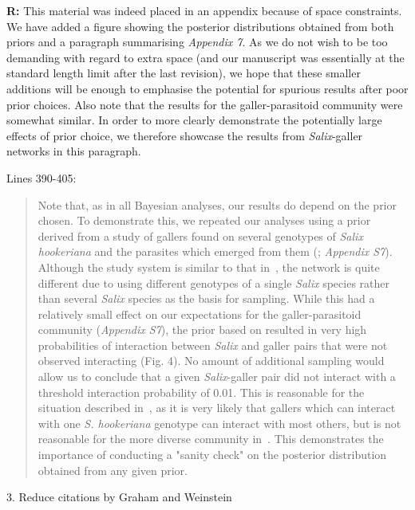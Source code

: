 \documentclass[12pt]{letter}
\begin{document}
		\textbf{R:} This material was indeed placed in an appendix because of space constraints. We have added a figure showing the posterior distributions obtained from both priors and a paragraph summarising \emph{Appendix 7}. As we do not wish to be too demanding with regard to extra space (and our manuscript was essentially at the standard length limit after the last revision), we hope that these smaller additions will be enough to emphasise the potential for spurious results after poor prior choices. Also note that the results for the galler-parasitoid community were somewhat similar. In order to more clearly demonstrate the potentially large effects of prior choice, we therefore showcase the results from \emph{Salix}-galler networks in this paragraph.


		Lines 390-405:

		\begin{quotation}

		  Note that, as in all Bayesian analyses, our results do depend on the prior chosen. To demonstrate this, we repeated our analyses using a prior derived from a study of gallers found on several genotypes of \emph{Salix hookeriana} and the parasites which emerged from them (\citealp{Barbour2016,Barbour2016Dryad}; \emph{Appendix S7}). Although the study system is similar to that in~\citet{Kopelke2017}, the network is quite different due to using different genotypes of a single \emph{Salix} species rather than several \emph{Salix} species as the basis for sampling. While this had a relatively small effect on our expectations for the galler-parasitoid community (\emph{Appendix S7}), the prior based on \citep{Barbour2016} resulted in very high probabilities of interaction between \emph{Salix} and galler pairs that were not observed interacting (Fig. 4). No amount of additional sampling would allow us to conclude that a given \emph{Salix}-galler pair did not interact with a threshold interaction probability of 0.01. This is reasonable for the situation described in~\citet{Barbour2016}, as it is very likely that gallers which can interact with one \emph{S. hookeriana} genotype can interact with most others, but is not reasonable for the more diverse community in~\citet{Kopelke2017}. This demonstrates the importance of conducting a "sanity check" on the posterior distribution obtained from any given prior.

		\end{quotation}



	3. Reduce citations by Graham and Weinstein 
\end{document}
